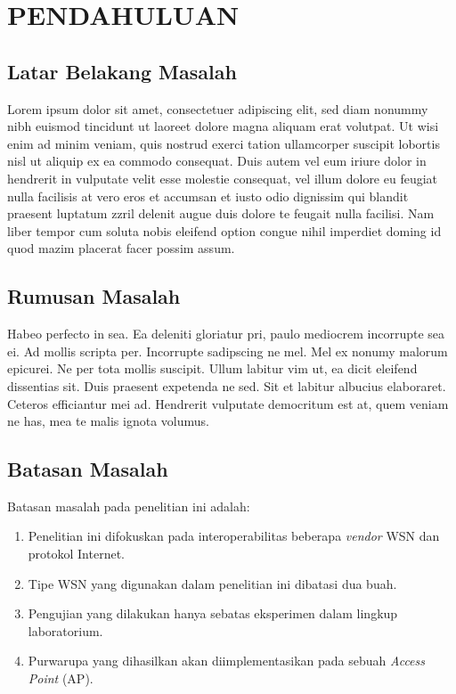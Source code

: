 
\chapter{PENDAHULUAN}

\section{Latar Belakang Masalah}
Lorem ipsum dolor sit amet, consectetuer adipiscing elit, sed diam nonummy nibh euismod tincidunt ut laoreet dolore magna aliquam erat volutpat. Ut wisi enim ad minim veniam, quis nostrud exerci tation ullamcorper suscipit lobortis nisl ut aliquip ex ea commodo consequat. Duis autem vel eum iriure dolor in hendrerit in vulputate velit esse molestie consequat, vel illum dolore eu feugiat nulla facilisis at vero eros et accumsan et iusto odio dignissim qui blandit praesent luptatum zzril delenit augue duis dolore te feugait nulla facilisi. Nam liber tempor cum soluta nobis eleifend option congue nihil imperdiet doming id quod mazim placerat facer possim assum.%

\section{Rumusan Masalah}
Habeo perfecto in sea. Ea deleniti gloriatur pri, paulo mediocrem incorrupte sea ei. Ad mollis scripta per. Incorrupte sadipscing ne mel. Mel ex nonumy malorum epicurei. Ne per tota mollis suscipit. Ullum labitur vim ut, ea dicit eleifend dissentias sit. Duis praesent expetenda ne sed. Sit et labitur albucius elaboraret. Ceteros efficiantur mei ad. Hendrerit vulputate democritum est at, quem veniam ne has, mea te malis ignota volumus.


\section{Batasan Masalah}
Batasan masalah pada penelitian ini adalah:
\begin{enumerate}
\item Penelitian ini difokuskan pada interoperabilitas beberapa \emph{vendor} WSN dan protokol Internet.
\item Tipe WSN yang digunakan dalam penelitian ini dibatasi dua buah.
\item Pengujian yang dilakukan hanya sebatas eksperimen dalam lingkup laboratorium.
\item Purwarupa yang dihasilkan akan diimplementasikan pada sebuah \emph{Access Point} (AP).
\end{enumerate}


